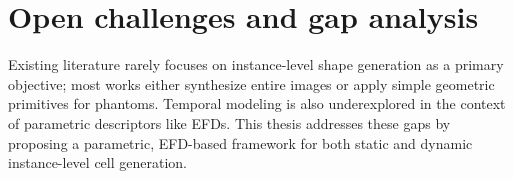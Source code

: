 \section{Open challenges and gap analysis}
Existing literature rarely focuses on instance-level shape generation as a primary objective; most works either synthesize entire images or apply simple geometric primitives for phantoms. Temporal modeling is also underexplored in the context of parametric descriptors like EFDs. This thesis addresses these gaps by proposing a parametric, EFD-based framework for both static and dynamic instance-level cell generation.
